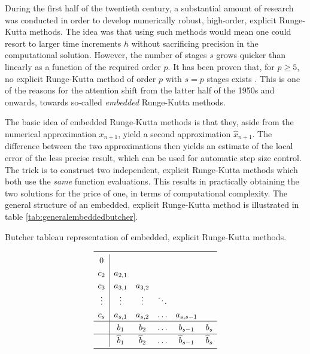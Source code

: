 During the first half of the twentieth century, a substantial amount of research
was conducted in order to develop numerically robust, high-order, explicit
Runge-Kutta methods. The idea was that using such methods would mean one could
resort to larger time increments $h$ without sacrificing precision in the
computational solution. However, the number of stages $s$ grows quicker than
linearly as a function of the required order $p$. It has been proven
that, for $p\geq5$, no explicit Runge-Kutta method of order $p$ with $s=p$
stages exists \parencite[p.173 in the 2008 printing]{hairer1993solving}. This is
one of the reasons for the attention shift from the latter half of the 1950s
and onwards, towards so-called \emph{embedded} Runge-Kutta methods.

The basic idea of embedded Runge-Kutta methods is that they, aside from the
numerical approximation $x_{n+1}$, yield a second approximation
$\widehat{x}_{n+1}$. The difference between the two approximations then yields
an estimate of the local error of the less precise result, which can be used for
automatic step size control. The trick is to construct two independent, explicit
Runge-Kutta methods which both use the \emph{same} function evaluations. This
results in practically obtaining the two solutions for the price of one, in
terms of computational complexity. The general structure of an embedded,
explicit Runge-Kutta method is illustrated in table
\ref{tab:generalembeddedbutcher}.

\begin{table}[htpb]
    \centering
    \caption[Butcher tableau representation of embedded, explicit
    Runge-Kutta methods]{Butcher tableau representation of embedded, explicit
                    Runge-Kutta methods.}
    \label{tab:generalembeddedbutcher}
    \[\renewcommand{\arraystretch}{1.25}
    \begin{array}{c|ccccc}
    \toprule
    0 \\
    c_{2} & a_{2,1} \\
    c_{3} & a_{3,1} & a_{3,2} \\
    \vdots & \vdots & \vdots & \ddots\\
    c_{s} & a_{s,1} & a_{s,2} & \ldots & a_{s,s-1}\\
    \hline
    & b_{1} & b_{2} & \ldots & b_{s-1} & b_{s} \\
    \hline
    & \widehat{b}_{1} & \widehat{b}_{2} & \ldots & \widehat{b}_{s-1}& \widehat{b}_{s}\\
    \bottomrule
    \end{array}
\]
\end{table}

